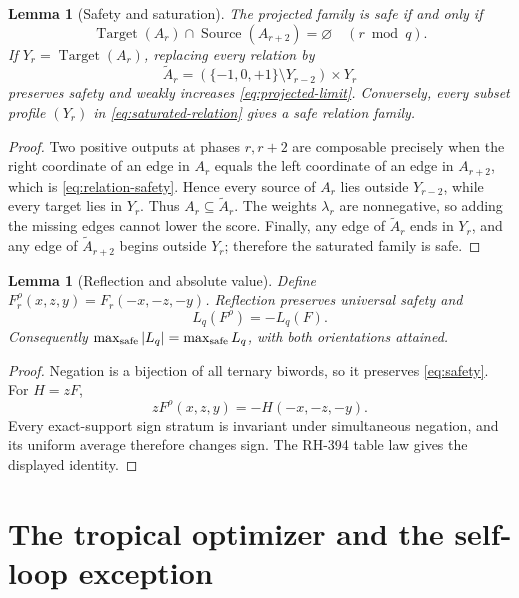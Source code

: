 \documentclass[11pt]{article}
\newtheorem{lemma}[theorem]{Lemma}
\theoremstyle{definition}
\theoremstyle{remark}
\newcommand{\T}{\{-1,0,+1\}}
\newcommand{\Target}{\operatorname{Target}}
\newcommand{\Source}{\operatorname{Source}}
\begin{document}
\begin{lemma}[Safety and saturation]
\label{lem:saturation}
The projected family is safe if and only if
\begin{equation}
 \Target(A_r)\cap\Source(A_{r+2})=\varnothing
 \quad(r\bmod q).
 \label{eq:relation-safety}
\end{equation}
If \(Y_r=\Target(A_r)\), replacing every relation by
\begin{equation}
 \widetilde A_r=(\T\setminus Y_{r-2})\times Y_r
 \label{eq:saturated-relation}
\end{equation}
preserves safety and weakly increases \eqref{eq:projected-limit}.
Conversely, every subset profile \((Y_r)\) in
\eqref{eq:saturated-relation} gives a safe relation family.
\end{lemma}

\begin{proof}
Two positive outputs at phases \(r,r+2\) are composable precisely when the
right coordinate of an edge in \(A_r\) equals the left coordinate of an
edge in \(A_{r+2}\), which is \eqref{eq:relation-safety}.  Hence every
source of \(A_r\) lies outside \(Y_{r-2}\), while every target lies in
\(Y_r\).  Thus \(A_r\subseteq\widetilde A_r\).  The weights
\(\lambda_r\) are nonnegative, so adding the missing edges cannot lower the
score.  Finally, any edge of \(\widetilde A_r\) ends in \(Y_r\), and any
edge of \(\widetilde A_{r+2}\) begins outside \(Y_r\); therefore the
saturated family is safe.
\end{proof}

\begin{lemma}[Reflection and absolute value]
\label{lem:reflection}
Define \(F^\rho_r(x,z,y)=F_r(-x,-z,-y)\).  Reflection preserves universal
safety and
\[
 L_q(F^\rho)=-L_q(F).
\]
Consequently \(\max_{\rm safe}|L_q|=\max_{\rm safe}L_q\), with both
orientations attained.
\end{lemma}

\begin{proof}
Negation is a bijection of all ternary biwords, so it preserves
\eqref{eq:safety}.  For \(H=zF\),
\[
 zF^\rho(x,z,y)=-H(-x,-z,-y).
\]
Every exact-support sign stratum is invariant under simultaneous
negation, and its uniform average therefore changes sign.  The RH-394
table law gives the displayed identity.
\end{proof}

\section{The tropical optimizer and the self-loop exception}
\end{document}
